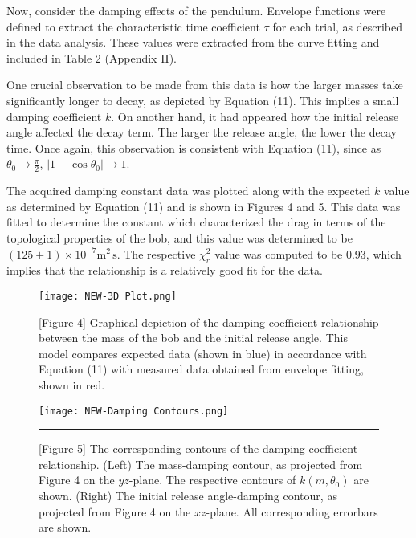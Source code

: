 \documentclass[11pt]{article}
\begin{document}
\begin{multicols}{2}
    Now, consider the damping effects of the pendulum. Envelope functions were defined to extract the characteristic time coefficient $\tau$ for each trial, as described in the data analysis. These values were extracted from the curve fitting and included in Table 2 (Appendix II). 
    
    One crucial observation to be made from this data is how the larger masses take significantly longer to decay, as depicted by Equation (11). This implies a small damping coefficient $k$. On another hand, it had appeared how the initial release angle affected the decay term. The larger the release angle, the lower the decay time. Once again, this observation is consistent with Equation (11), since as $\theta_0\rightarrow \frac{\pi}{2}$, $|1-\cos\theta_0|\rightarrow 1$. 
    
    The acquired damping constant data was plotted along with the expected $k$ value as determined by Equation (11) and is shown in Figures 4 and 5. This data was fitted to determine the constant which characterized the drag in terms of the topological properties of the bob, and this value was determined to be $(125\pm 1)\times 10^{-7} \text{m}^2\, \text{s}$. The respective $\chi^2_r$ value was computed to be $0.93$, which implies that the relationship is a relatively good fit for the data. 



    \begin{figure}[H]
        \flushleft
        \texttt{[image: NEW-3D Plot.png]}
        \caption*{[Figure 4] Graphical depiction of the damping coefficient relationship between the mass of the bob and the initial release angle. This model compares expected data (shown in blue) in accordance with Equation (11) with measured data obtained from envelope fitting, shown in red.}
    \end{figure}

    
    
    \begin{figure*}[t]
        \vspace{-30pt}
    \begin{minipage}[t]{0.3\linewidth}
        \texttt{[image: NEW-Damping Contours.png]}
    \end{minipage}\rule{0.5em}{0pt}%
    \caption*{[Figure 5] The corresponding contours of the damping coefficient relationship. (Left) The mass-damping contour, as projected from Figure 4 on the $yz$-plane. The respective contours of $k(m,\theta_0)$ are shown. (Right) The initial release angle-damping contour, as projected from Figure 4 on the $xz$-plane. All corresponding errorbars are shown.}
    \end{figure*}


\end{multicols}
\end{document}
